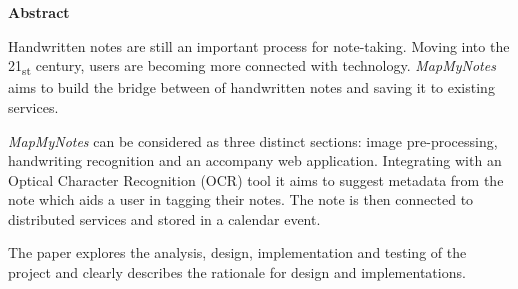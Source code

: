 \thispagestyle{empty}

\begin{center}
    {\LARGE\bf Abstract}
\end{center}


Handwritten notes are still an important process for note-taking. Moving into the 21\textsubscript{st} century, users are becoming more connected with technology. \textit{MapMyNotes} aims to build the bridge between of handwritten notes and saving it to existing services.

\textit{MapMyNotes} can be considered as three distinct sections: image pre-processing, handwriting recognition and an accompany web application. Integrating with an Optical Character Recognition (OCR) tool it aims to suggest metadata from the note which aids a user in tagging their notes. The note is then connected to distributed services and stored in a calendar event.

The paper explores the analysis, design, implementation and testing of the project and clearly describes the rationale for design and implementations.
